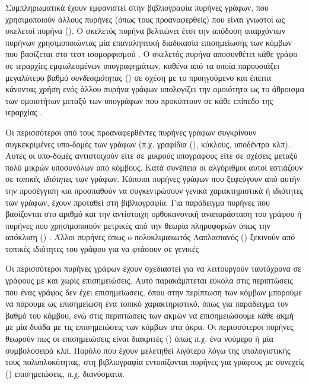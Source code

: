 Συμπληρωματικά έχουν εμφανιστεί στην βιβλιογραφία πυρήνες γράφων, που χρησιμοποιούν άλλους πυρήνες (όπως τους προαναφερθείς) που είναι γνωστοί ως σκελετοί πυρήνα ().
Ο σκελετός πυρήνα  βελτιώνει έτσι την απόδοση υπαρχόντων πυρήνων χρησιμοποιώντας μία επαναληπτική διαδικασία επισημείωσης των κόμβων που βασίζεται στο τεστ ισομορφισμού  \cite{shervashidze2011weisfeiler}.
Ο σκελετός πυρήνα  αποσυνθέτει κάθε γράφο σε ιεραρχίες εμφωλευμένων υπογραφημάτων, καθένα από τα οποία παρουσιάζει μεγαλύτερο βαθμό \textit{συνδεσιμότητας} () σε σχέση με το προηγούμενο και έπειτα κάνοντας χρήση ενός άλλου πυρήνα γράφων υπολογίζει την ομοιότητα ως το άθροισμα των ομοιοτήτων μεταξύ των υπογράφων που προκύπτουν σε κάθε επίπεδο της ιεραρχίας \cite{nikolentzos2018}.\par
Οι περισσότεροι από τους προαναφερθέντες πυρήνες γράφων συγκρίνουν συγκεκριμένες υπο-δομές των γράφων (π.χ. γραφίδια (), κύκλους, υποδέντρα κλπ).
Αυτές οι υπο-δομές αντιστοιχούν είτε σε μικρούς υπογράφους είτε σε σχέσεις μεταξύ πολύ μικρών υποσυνόλων από κόμβους.
Κατά συνέπεια οι αλγόριθμοι αυτοί εστιάζουν σε \textit{τοπικές ιδιότητες} των γράφων.
Κάποιοι πυρήνες γράφων που ξεφεύγουν από αυτήν την προσέγγιση και προσπαθούν να συγκεντρώσουν γενικά χαρακτηριστικά ή ιδιότητες των γράφων, έχουν προταθεί στη βιβλιογραφία.
Για παράδειγμα πυρήνες που βασίζονται στο αριθμό  και την αντίστοιχη ορθοκανονική αναπαράσταση του γράφου \cite{johansson2014global} ή πυρήνες που χρησιμοποιούν μετρικές από την θεωρία πληροφοριών όπως την απόκλιση ()  \cite{Bai12}.
Άλλοι πυρήνες όπως o πολυκλιμακωτός Λαπλασιανός () ξεκινούν από τοπικές ιδιότητες του γράφου για να φτάσουν σε γενικές \cite{kondor2016multiscale}\par
Οι περισσότεροι πυρήνες γράφων έχουν σχεδιαστεί για να λειτουργούν ταυτόχρονα σε γράφους με και χωρίς επισημειώσεις.
Αυτό παρακάμπτεται εύκολα στις περιπτώσεις που ένας γράφος δεν έχει επισημείωσεις, όπου στην περίπτωση των κόμβων μπορούμε να πάρουμε ως επισημείωση ένα τοπικό χαρακτηριστικό, όπως για παράδειγμα τον βαθμό του κόμβου, ενώ στις περιπτώσεις των ακμών να επισημειώσουμε κάθε ακμή με μία δυάδα με τις επισημειώσεις των κόμβων στα άκρα.
Οι περισσότεροι πυρήνες θεωρούν πως οι επισημειώσεις είναι διακριτές () όπως π.χ. ένα νούμερο ή μία συμβολοσειρά κλπ.
Παρόλο που έχουν μελετηθεί λιγότερο λόγω της υπολογιστικής τους πολυπλοκότητας, στη βιβλιογραφία εντοπίζονται πυρήνες για γράφους με συνεχείς () επισημειώσεις, π.χ. διανύσματα.
